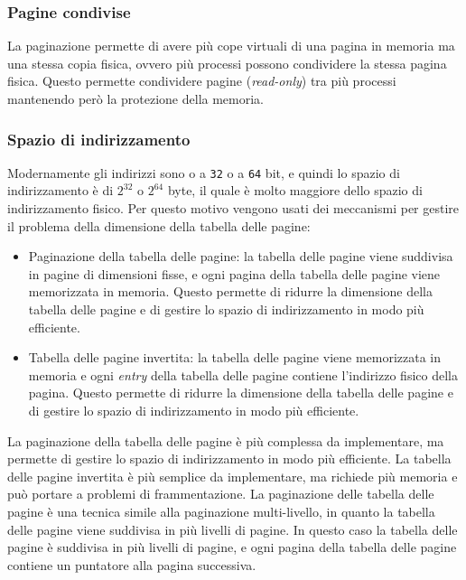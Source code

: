         \subsubsection{Pagine condivise}    
            La paginazione permette di avere più cope virtuali di una pagina in memoria ma una stessa copia fisica, ovvero più processi possono condividere la stessa pagina fisica. Questo permette condividere pagine (\textit{read-only}) tra più processi mantenendo però la protezione della memoria.
        \subsubsection{Spazio di indirizzamento}
            Modernamente gli indirizzi sono o a \texttt{32} o a \texttt{64} bit, e quindi lo spazio di indirizzamento è di $2^{32}$ o $2^{64}$ byte, il quale è molto maggiore dello spazio di indirizzamento fisico. Per questo motivo vengono usati dei meccanismi per gestire il problema della dimensione della tabella delle pagine:
            \begin{itemize}
                \item Paginazione della tabella delle pagine: la tabella delle pagine viene suddivisa in pagine di dimensioni fisse, e ogni pagina della tabella delle pagine viene memorizzata in memoria. Questo permette di ridurre la dimensione della tabella delle pagine e di gestire lo spazio di indirizzamento in modo più efficiente.
                \item Tabella delle pagine invertita: la tabella delle pagine viene memorizzata in memoria e ogni \textit{entry} della tabella delle pagine contiene l'indirizzo fisico della pagina. Questo permette di ridurre la dimensione della tabella delle pagine e di gestire lo spazio di indirizzamento in modo più efficiente.
            \end{itemize}
            La paginazione della tabella delle pagine è più complessa da implementare, ma permette di gestire lo spazio di indirizzamento in modo più efficiente. La tabella delle pagine invertita è più semplice da implementare, ma richiede più memoria e può portare a problemi di frammentazione.\newline
            La paginazione delle tabella delle pagine è una tecnica simile alla paginazione multi-livello, in quanto la tabella delle pagine viene suddivisa in più livelli di pagine. In questo caso la tabella delle pagine è suddivisa in più livelli di pagine, e ogni pagina della tabella delle pagine contiene un puntatore alla pagina successiva.
